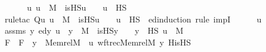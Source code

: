 \begin{isabellebody}
%
\isadelimproof
\isanewline
%
\endisadelimproof
%
\isatagproof
{}\isamarkupfalse%
\ {\isacharminus}{\kern0pt}\ \isanewline
\ \ \isamarkupfalse%
\ {\isachardoublequoteopen}{\isasymAnd}u{\isachardot}{\kern0pt}\ u\ {\isasymin}\ M\ {\isasymlongrightarrow}\ is{\isacharunderscore}{\kern0pt}HS{\isacharparenleft}{\kern0pt}u{\isacharparenright}{\kern0pt}\ {\isacharequal}{\kern0pt}\ {}\ {\isasymlongleftrightarrow}\ u\ {\isasymin}\ HS{\isachardoublequoteclose}\ \isanewline
\ \ \isamarkupfalse%
\ {\isacharparenleft}{\kern0pt}rule{\isacharunderscore}{\kern0pt}tac\ Q{\isacharequal}{\kern0pt}{\isachardoublequoteopen}{\isasymlambda}u{\isachardot}{\kern0pt}\ u\ {\isasymin}\ M\ {\isasymlongrightarrow}\ is{\isacharunderscore}{\kern0pt}HS{\isacharparenleft}{\kern0pt}u{\isacharparenright}{\kern0pt}\ {\isacharequal}{\kern0pt}\ {}\ {\isasymlongleftrightarrow}\ u\ {\isasymin}\ HS{\isachardoublequoteclose}\ \ ed{\isacharunderscore}{\kern0pt}induction{\isacharcomma}{\kern0pt}\ rule\ impI{\isacharparenright}{\kern0pt}\isanewline
\ \ \ \ \isamarkupfalse%
\ u\ \isanewline
\ \ \ \ \isamarkupfalse%
\ assms{}{\isacharcolon}{\kern0pt}\ {\isachardoublequoteopen}{\isacharparenleft}{\kern0pt}{\isasymAnd}y{\isachardot}{\kern0pt}\ ed{\isacharparenleft}{\kern0pt}y{\isacharcomma}{\kern0pt}\ u{\isacharparenright}{\kern0pt}\ {\isasymLongrightarrow}\ y\ {\isasymin}\ M\ {\isasymlongrightarrow}\ is{\isacharunderscore}{\kern0pt}HS{\isacharparenleft}{\kern0pt}y{\isacharparenright}{\kern0pt}\ {\isacharequal}{\kern0pt}\ {}\ {\isasymlongleftrightarrow}\ y\ {\isasymin}\ HS{\isacharparenright}{\kern0pt}{\isachardoublequoteclose}\ {\isachardoublequoteopen}u\ {\isasymin}\ M{\isachardoublequoteclose}\isanewline
\isanewline
\ \ \ \ \isamarkupfalse%
\ F\ \ {\isachardoublequoteopen}F\ {\isasymequiv}\ {\isasymlambda}y\ {\isasymin}\ Memrel{\isacharparenleft}{\kern0pt}M{\isacharparenright}{\kern0pt}{\isacharcircum}{\kern0pt}{\isacharplus}{\kern0pt}\ {\isacharminus}{\kern0pt}{\isacharbackquote}{\kern0pt}{\isacharbackquote}{\kern0pt}\ {\isacharbraceleft}{\kern0pt}u{\isacharbraceright}{\kern0pt}{\isachardot}{\kern0pt}\ wftrec{\isacharparenleft}{\kern0pt}Memrel{\isacharparenleft}{\kern0pt}M{\isacharparenright}{\kern0pt}{\isacharcircum}{\kern0pt}{\isacharplus}{\kern0pt}{\isacharcomma}{\kern0pt}\ y{\isacharcomma}{\kern0pt}\ His{\isacharunderscore}{\kern0pt}HS{\isacharparenright}{\kern0pt}{\isachardoublequoteclose}\ \isanewline
\isanewline

\end{isabellebody}

